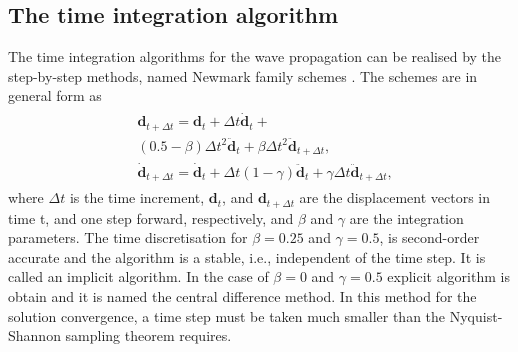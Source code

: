 \documentclass[a4paper,fleqn]{cas-dc}
\begin{document}
\subsection{The time integration algorithm}
The time integration algorithms for the wave propagation can be realised by the step-by-step methods, named Newmark family schemes \cite{newmark1959method}.
The schemes are in general form as
\begin{eqnarray}
	\label{eq:u_newmark}
	\begin{split}
	& \textbf{d}_{t+\Delta t} = \textbf{d}_{t} +\Delta t \dot{\textbf{d}}_{t} +\\
	& \left( 0.5 - \beta \right)\Delta t^2\ddot{\textbf{d}}_{t} + \beta \Delta t^2\ddot{\textbf{d}}_{t+\Delta t},\\
	& \dot{\textbf{d}}_{t+\Delta t} = \dot{\textbf{d}}_{t} + \Delta t\left(1-\gamma\right)\ddot{\textbf{d}}_{t} + \gamma \Delta t\ddot{\textbf{d}}_{t+\Delta t},
	\end{split}
\end{eqnarray}
where \(\Delta t\) is the time increment, \(\textbf{d}_{t}\), and \(\textbf{d}_{t+\Delta t}\) are the displacement vectors in time t, and one step forward, respectively, and \(\beta\) and \(\gamma\) are the integration parameters.
The time discretisation for \(\beta = 0.25\) and \(\gamma = 0.5\), is second-order accurate and the algorithm is a stable, i.e., independent of the time step. It is called an implicit algorithm.
In the case of \(\beta = 0\) and \(\gamma = 0.5\) explicit algorithm is obtain and it is named the central difference method.
In this method for the solution convergence, a time step must be taken much smaller than the Nyquist-Shannon sampling theorem requires.
\end{document}
